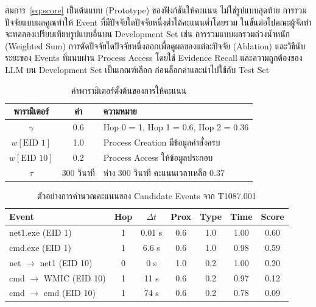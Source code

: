 สมการ~\eqref{eq:score} เป็นต้นแบบ (Prototype) ของฟังก์ชันให้คะแนน ไม่ใช่รูปแบบสุดท้าย
การรวมปัจจัยแบบผลคูณทำให้ Event ที่มีปัจจัยใดปัจจัยหนึ่งต่ำได้คะแนนต่ำโดยรวม
ในขั้นต่อไปคณะผู้จัดทำจะทดลองเปรียบเทียบรูปแบบอื่นบน Development Set
เช่น การรวมแบบผลรวมถ่วงน้ำหนัก (Weighted Sum) การตัดปัจจัยใดปัจจัยหนึ่งออกเพื่อดูผลของแต่ละปัจจัย (Ablation)
และวิธีนับระยะของ Events ที่แนบผ่าน Process Access
โดยใช้ Evidence Recall และความถูกต้องของ LLM บน Development Set เป็นเกณฑ์เลือก
ก่อนล็อกค่าและนำไปใช้กับ Test Set

\begin{table}[ht]
  \centering
  \caption{ค่าพารามิเตอร์ตั้งต้นของการให้คะแนน}
  \label{tab:score-param}
  \begin{tabular}{|c|c|l|}
    \hline
    \textbf{พารามิเตอร์} & \textbf{ค่า} & \textbf{ความหมาย} \\ \hline
    $\gamma$ & 0.6 & Hop 0 = 1, Hop 1 = 0.6, Hop 2 = 0.36 \\ \hline
    $w[\text{EID 1}]$ & 1.0 & Process Creation มีข้อมูลคำสั่งครบ \\ \hline
    $w[\text{EID 10}]$ & 0.2 & Process Access ให้ข้อมูลประกอบ \\ \hline
    $\tau$ & 300 วินาที & ห่าง 300 วินาที คะแนนเวลาเหลือ 0.37 \\ \hline
  \end{tabular}
\end{table}

\begin{table}[ht]
  \centering
  \caption{ตัวอย่างการคำนวณคะแนนของ Candidate Events จาก T1087.001}
  \label{tab:score-example}
  \begin{tabular}{|l|c|c|c|c|c|c|}
    \hline
    \textbf{Event} & \textbf{Hop} & \textbf{$\Delta t$} & \textbf{Prox} & \textbf{Type} & \textbf{Time} & \textbf{Score} \\ \hline
    net1.exe (EID 1)         & 1 & 0.01 s & 0.6 & 1.0 & 1.00 & 0.60 \\ \hline
    cmd.exe (EID 1)          & 1 & 6.6 s  & 0.6 & 1.0 & 0.98 & 0.59 \\ \hline
    net $\rightarrow$ net1 (EID 10) & 0 & 0 s & 1.0 & 0.2 & 1.00 & 0.20 \\ \hline
    cmd $\rightarrow$ WMIC (EID 10) & 1 & 11 s & 0.6 & 0.2 & 0.97 & 0.12 \\ \hline
    cmd $\rightarrow$ cmd (EID 10)  & 1 & 74 s & 0.6 & 0.2 & 0.78 & 0.09 \\ \hline
  \end{tabular}
\end{table}

